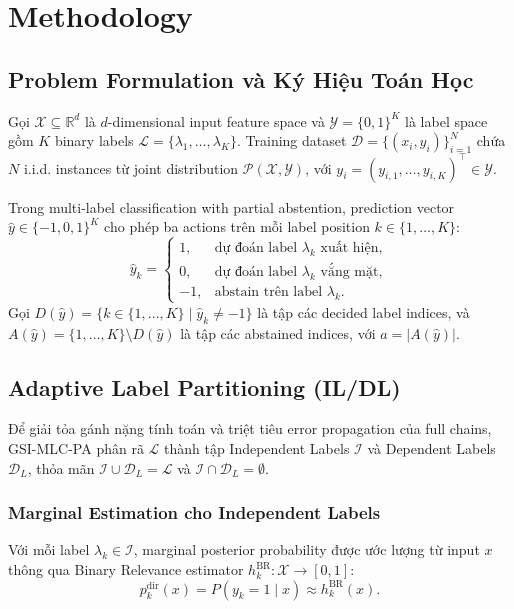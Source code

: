 \documentclass[conference]{IEEEtran}
\begin{document}
\section{Methodology}

\subsection{Problem Formulation và Ký Hiệu Toán Học}
Gọi $\mathcal{X} \subseteq \mathbb{R}^d$ là $d$-dimensional input feature space và $\mathcal{Y} = \{0, 1\}^K$ là label space gồm $K$ binary labels $\mathcal{L} = \{\lambda_1, \dots, \lambda_K\}$. Training dataset $\mathcal{D} = \{(x_i, y_i)\}_{i=1}^N$ chứa $N$ i.i.d. instances từ joint distribution $\mathcal{P}(\mathcal{X}, \mathcal{Y})$, với $y_i = (y_{i,1}, \dots, y_{i,K})^\top \in \mathcal{Y}$.

Trong multi-label classification with partial abstention, prediction vector $\hat{y} \in \{-1, 0, 1\}^K$ cho phép ba actions trên mỗi label position $k \in \{1, \dots, K\}$:
\begin{equation}
    \hat{y}_k = \begin{cases}
        1, & \text{dự đoán label } \lambda_k \text{ xuất hiện}, \\
        0, & \text{dự đoán label } \lambda_k \text{ vắng mặt}, \\
        -1, & \text{abstain trên label } \lambda_k.
    \end{cases}
\end{equation}
Gọi $D(\hat{y}) = \{k \in \{1, \dots, K\} \mid \hat{y}_k \neq -1\}$ là tập các decided label indices, và $A(\hat{y}) = \{1, \dots, K\} \setminus D(\hat{y})$ là tập các abstained indices, với $a = |A(\hat{y})|$.

\subsection{Adaptive Label Partitioning (IL/DL)}
Để giải tỏa gánh nặng tính toán và triệt tiêu error propagation của full chains, GSI-MLC-PA phân rã $\mathcal{L}$ thành tập Independent Labels $\mathcal{I}$ và Dependent Labels $\mathcal{D}_L$, thỏa mãn $\mathcal{I} \cup \mathcal{D}_L = \mathcal{L}$ và $\mathcal{I} \cap \mathcal{D}_L = \emptyset$.

\subsubsection{Marginal Estimation cho Independent Labels}
Với mỗi label $\lambda_k \in \mathcal{I}$, marginal posterior probability được ước lượng từ input $x$ thông qua Binary Relevance estimator $h_k^{\text{BR}}: \mathcal{X} \to [0, 1]$:
\begin{equation}
    p_k^{\text{dir}}(x) = P(y_k = 1 \mid x) \approx h_k^{\text{BR}}(x).
\end{equation}
\end{document}
